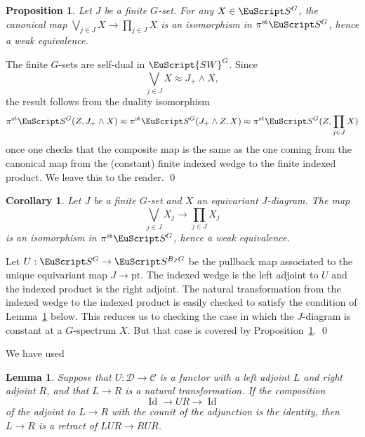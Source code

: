 \documentclass{amsart}
\newtheorem{cor}[equation]{Corollary}
\newtheorem{lem}[equation]{Lemma}
\newtheorem{prop}[equation]{Proposition}
\theoremstyle{definition}
\theoremstyle{remark}
\newenvironment{pf}{\bigskip{\em Proof:\/}}{\qed\medskip}
\newcommand{\spectra}{\EuScript S}
\newcommand{\swg}[1]{\EuScript {SW}^{#1}}
\newcommand{\ugspectra}[1]{\spectra^{#1}}
\newcommand{\cat}[1]{{\mathcal #1}}
\newcommand{\pist}{\pi^{\text{st}}}
\DeclareMathOperator{\id}{Id}
\begin{document}
\begin{prop}
\label{thm:134} Let $J$ be a finite $G$-set.  For any
$X\in\ugspectra{G}$, the canonical map $\bigvee_{j\in J} X\to
\prod_{j\in J}X$ is an isomorphism in $\pist\ugspectra{G}$, hence a
weak equivalence.
\end{prop}

\begin{pf}
The finite $G$-sets are self-dual in $\swg{G}$.  Since
\[
\bigvee_{j\in J}X \approx J_{+}\wedge X,
\]
the result follows from the duality isomorphism
\[
\pist\ugspectra{G}(Z,J_{+}\wedge X) \approx
\pist\ugspectra{G}(J_{+}\wedge Z, X) \approx
\pist\ugspectra{G}(Z, \prod_{j\in J}X) 
\]
once one checks that the composite map is the same as the one coming
from the canonical map from the (constant) finite indexed wedge to the
finite indexed product.  We leave this to the reader.
\end{pf}

\begin{cor}
\label{thm:128}
Let $J$ be a finite $G$-set and $X$ an equivariant $J$-diagram.   The
map
\[
\bigvee_{j\in J}X_{j}\to \prod_{j\in J}X_{j}
\]
is an isomorphism in $\pist\ugspectra{G}$, hence a weak equivalence.
\end{cor}

\begin{pf}
Let $U:\ugspectra{G}\to \spectra^{B_{J}G}$ be the pullback map
associated to the unique equivariant map $J\to \text{pt}$.   The
indexed wedge is the left adjoint to $U$ and the indexed product is
the right adjoint.   The natural transformation from the indexed wedge
to the indexed product is easily checked to satisfy the condition of
Lemma~\ref{thm:135} below.   This reduces us to checking the case in
which the $J$-diagram is constant at a $G$-spectrum $X$.  But that
case is covered by Proposition~\ref{thm:134}.
\end{pf}

We have used 

\begin{lem}
\label{thm:135} Suppose that $U:\cat D\to \cat C$ is a functor with a
left adjoint $L$ and right adjoint $R$, and that $L\to R$ is a natural
transformation.  If the composition
\begin{equation}
\label{eq:165}
\id\to UR \to \id
\end{equation}
of the adjoint to $L\to R$ with the counit of the adjunction is the
identity, then $L\to R$ is a retract of $LUR\to RUR$.
\end{lem}
\end{document}
